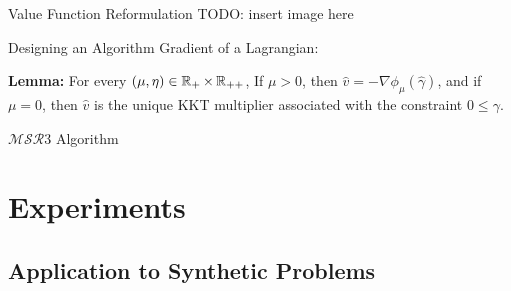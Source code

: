 \documentclass[8pt]{beamer}
\newcommand{\ouralgo}{\ensuremath{\mathcal{MSR}3}}
\begin{document}
\begin{frame}{Value Function Reformulation}
TODO: insert image here
\end{frame}

\begin{frame}{Designing an Algorithm}
	Gradient of a Lagrangian:
	
\textbf{Lemma:} For every $(\mu,\eta) \in \operatorname{\mathbb{R}}_+\times\operatorname{\mathbb{R}}_{++}$,
If $\mu > 0$, then $\hat{v} = -\nabla\phi_\mu(\hat{\gamma})$, and if $\mu = 0$, then $\hat{v}$ is the unique KKT multiplier associated with the constraint $0 \leq \gamma$.
\end{frame}

\begin{frame}{$\ouralgo$ Algorithm}

\end{frame}

\section{Experiments}
\subsection{Application to Synthetic Problems}
\end{document}
